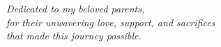 \newpage
\thispagestyle{empty}
\vspace*{\fill}
\begin{center}
\Large
\textit{Dedicated to my beloved parents,\\
for their unwavering love, support, and sacrifices\\
that made this journey possible.}
\end{center}
\vspace*{\fill}
\clearpage